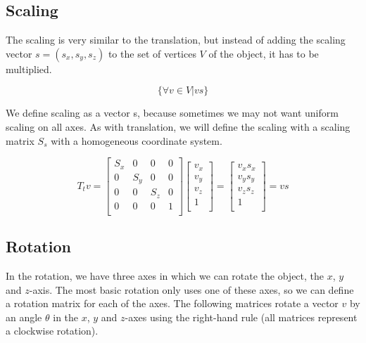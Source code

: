 \documentclass[titlepage,12pt]{report}
\begin{document}
\subsection{Scaling}

The scaling is very similar to the translation, but instead of adding the scaling vector $s = (s_x, s_y, s_z)$ to the set of vertices $V$ of the object, it has to be multiplied.

\begin{equation}
\{\forall v \in V | v s\}
\end{equation}

We define scaling as a vector s, because sometimes we may not want uniform scaling on all axes. As with translation, we will define the scaling with a scaling matrix $S_s$ with a homogeneous coordinate system.

\begin{equation}\label{scaling}
T_t v = 
\begin{bmatrix}
S_x & 0 & 0 & 0 \\
0 & S_y & 0 & 0 \\
0 & 0 & S_z & 0 \\
0 & 0 & 0 & 1 \\
\end{bmatrix}
\begin{bmatrix}
v_x \\
v_y \\
v_z \\
1 \\
\end{bmatrix}
=
\begin{bmatrix}
v_x s_x \\
v_y s_y \\
v_z s_z \\
1 \\
\end{bmatrix}
= v s
\end{equation}

\subsection{Rotation}

In the rotation, we have three axes in which we can rotate the object, the $x$, $y$ and $z$-axis. The most basic rotation only uses one of these axes, so we can define a rotation matrix for each of the axes. The following matrices rotate a vector $v$ by an angle $\theta$ in the $x$, $y$ and $z$-axes using the right-hand rule (all matrices represent a clockwise rotation).
\end{document}
